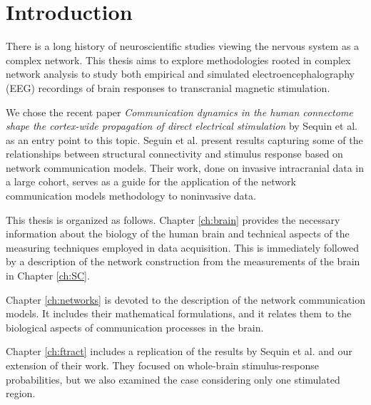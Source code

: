 \chapter*{Introduction}

There is a long history of neuroscientific studies viewing the nervous system as a complex network.\cite{sporns_structure_2013} This thesis aims to explore methodologies rooted in complex network analysis to study both empirical and simulated electroencephalography (EEG) recordings of brain responses to transcranial magnetic stimulation. 

We chose the recent paper \textit{Communication dynamics in the human connectome shape the cortex-wide propagation of direct electrical stimulation} by Sequin et al. \cite{seguin_communication_2023} as an entry point to this topic. Seguin et al. present results capturing some of the relationships between structural connectivity and stimulus response based on network communication models. Their work, done on invasive intracranial data in a large cohort, serves as a guide for the application of the network communication models methodology to noninvasive data.

This thesis is organized as follows. Chapter \ref{ch:brain} provides the necessary information about the biology of the human brain and technical aspects of the measuring techniques employed in data acquisition. This is immediately followed by a description of the network construction from the measurements of the brain in Chapter \ref{ch:SC}.

Chapter \ref{ch:networks} is devoted to the description of the network communication models. It includes their mathematical formulations, and it relates them to the biological aspects of communication processes in the brain.

Chapter \ref{ch:ftract} includes a replication of the results by Sequin et al. and our extension of their work. They focused on whole-brain stimulus-response probabilities, but we also examined the case considering only one stimulated region. 

